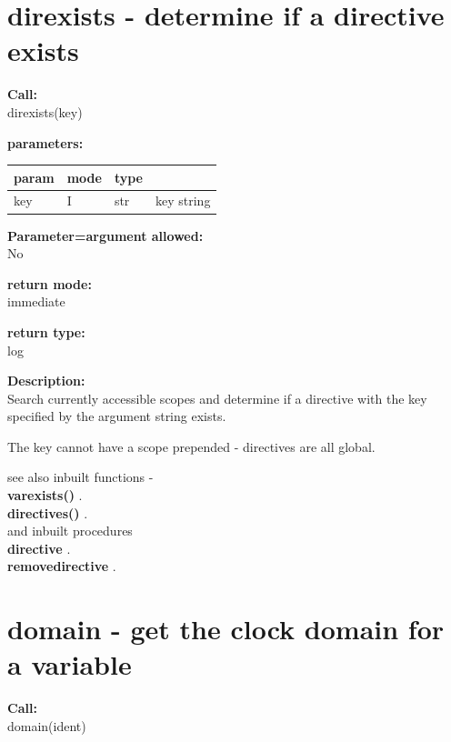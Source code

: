     \section{direxists - determine if a directive exists}\label{sec:ifdirexists}
        
        {\bf Call:} \\
        direxists(key)
        
        {\bf parameters:} \\
        \begin{tabular}{| l | l | l | l |}
        \hline
        param  & mode & type & \\
        \hline \hline
        key & I &  str  & key string \\ \hline
        \end{tabular}
        
        {\bf Parameter=argument allowed:} \\
        No
        
        {\bf return mode:} \\
        immediate

        {\bf return type:} \\
        log
        
        {\bf Description:} \\
        Search currently accessible scopes and determine if a directive with the
        key specified by the argument string exists.
        
        The key cannot have a scope prepended - directives are all global.
        
        see also inbuilt functions - \\
        {\bf varexists()} . \\
        {\bf directives()} . \\
        and inbuilt procedures \\
        {\bf directive} .\\
        {\bf removedirective} .


    \section{domain - get the clock domain for a variable}\label{sec:ifdomain}
        
        {\bf Call:} \\
        domain(ident)
        
